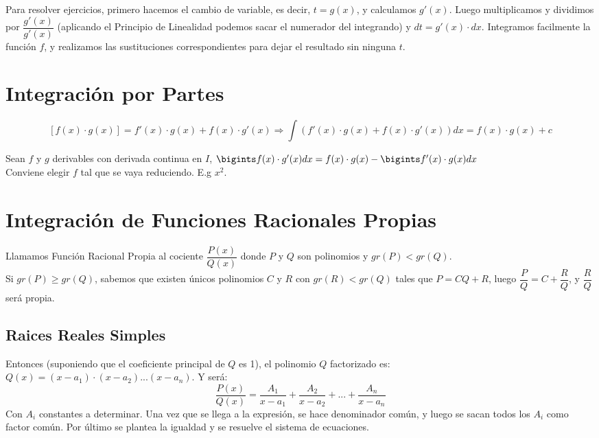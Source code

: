 \documentclass[11pt,a4paper]{article}
\begin{document}
\noindent Para resolver ejercicios, primero hacemos el cambio de variable, es decir, $t=g(x)$, y calculamos $g'(x)$. Luego multiplicamos y dividimos por $\dfrac{g'(x)}{g'(x)}$ (aplicando el Principio de Linealidad podemos sacar el numerador del integrando) y $dt = g'(x)\cdot dx$. Integramos facilmente la funci\'on $f$, y realizamos las sustituciones correspondientes para dejar el resultado sin ninguna $t$.

\section{Integraci\'on por Partes}
$$[f(x)\cdot g(x)] = f'(x)\cdot g(x) + f(x)\cdot g'(x) \Rightarrow \int (f'(x)\cdot g(x) + f(x)\cdot g'(x))dx = f(x)\cdot g(x)+c$$

\noindent Sean $f$ y $g$ derivables con derivada continua en $I$, $\bigints f(x)\cdot g'(x)dx = f(x)\cdot g(x) - \bigints f'(x)\cdot g(x) dx$\\

\noindent Conviene elegir $f$ tal que se vaya reduciendo. E.g $x^2$.

\section{Integraci\'on de Funciones Racionales Propias}
\noindent Llamamos Funci\'on Racional Propia al cociente $\dfrac{P(x)}{Q(x)}$ donde $P$ y $Q$ son polinomios y $gr(P)<gr(Q)$.\\

\noindent Si $gr(P)\geq gr(Q)$, sabemos que existen \'unicos polinomios $C$ y $R$ con $gr(R)<gr(Q)$ tales que $P=CQ+R$, luego $\dfrac{P}{Q} = C + \dfrac{R}{Q}$, y $\dfrac{R}{Q}$ ser\'a propia.

\subsection{Raices Reales Simples}
Entonces (suponiendo que el coeficiente principal de $Q$ es 1), el polinomio $Q$ factorizado es:\\ $Q(x)=(x-a_1)\cdot(x-a_2)...(x-a_n)$. Y ser\'a: $$\dfrac{P(x)}{Q(x)} = \dfrac{A_1}{x-a_1} + \dfrac{A_2}{x-a_2} + ... + \dfrac{A_n}{x-a_n}$$
Con $A_i$ constantes a determinar.
Una vez que se llega a la expresi\'on, se hace denominador com\'un, y luego se sacan todos los $A_i$ como factor com\'un. Por \'ultimo se plantea la igualdad y se resuelve el sistema de ecuaciones.

\newpage
\end{document}
